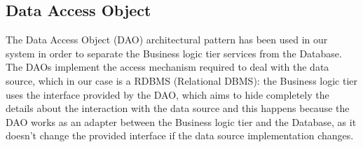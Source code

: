 \documentclass[../../../DD.tex]{subfiles}
\begin{document}
	
	\subsection{Data Access Object\label{subsect:2.6.4}}
	The Data Access Object (DAO) architectural pattern has been used in our system in order to separate the Business logic tier services from the Database. The DAOs implement the access mechanism required to deal with the data source, which in our case is a RDBMS (Relational DBMS): the Business logic tier uses the interface provided by the DAO, which aims to hide completely the details about the interaction with the data source and this happens because the DAO works as an adapter between the Business logic tier and the Database, as it doesn't change the provided interface if the data source implementation changes.
	
\end{document}
